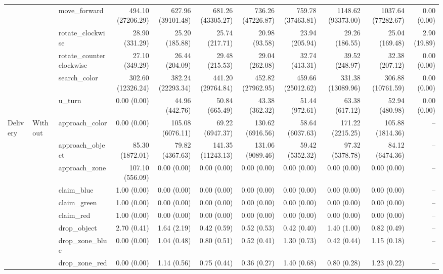 \begin{table}[t]
{\begin{tabular}{lllrrrrrrrr}
 &  & move\_forward & 494.10 (27206.29) & 627.96 (39101.48) & 681.26 (43305.27) & 736.26 (47226.87) & 759.78 (37463.81) & 1148.62 (93373.00) & 1037.64 (77282.67) & 0.00 (0.00) \\
 &  & rotate\_clockwise & 28.90 (331.29) & 25.20 (185.88) & 25.74 (217.71) & 20.98 (93.58) & 23.94 (205.94) & 29.26 (186.55) & 25.04 (169.48) & 2.90 (19.89) \\
 &  & rotate\_counterclockwise & 27.10 (349.29) & 26.44 (204.09) & 29.48 (215.53) & 29.04 (262.08) & 32.74 (413.31) & 39.52 (248.97) & 32.38 (207.12) & 0.00 (0.00) \\
 &  & search\_color & 302.60 (12326.24) & 382.24 (22293.34) & 441.20 (29764.84) & 452.82 (27962.95) & 459.66 (25012.62) & 331.38 (13089.96) & 306.88 (10761.59) & 0.00 (0.00) \\
 &  & u\_turn & 0.00 (0.00) & 44.96 (442.76) & 50.84 (665.49) & 43.38 (362.32) & 51.44 (972.61) & 63.38 (617.12) & 52.94 (480.98) & 0.00 (0.00) \\
\hline
Delivery & Without & approach\_color & 0.00 (0.00) & 105.08 (6076.11) & 69.22 (6947.37) & 130.62 (6916.56) & 58.64 (6037.63) & 171.22 (2215.25) & 105.88 (1814.36) & -- \\
 &  & approach\_object & 85.30 (1872.01) & 79.82 (4367.63) & 141.35 (11243.13) & 131.06 (9089.46) & 59.42 (5352.32) & 97.32 (5378.78) & 84.12 (6474.36) & -- \\
 &  & approach\_zone & 107.10 (556.09) & 0.00 (0.00) & 0.00 (0.00) & 0.00 (0.00) & 0.00 (0.00) & 0.00 (0.00) & 0.00 (0.00) & -- \\
 &  & claim\_blue & 1.00 (0.00) & 0.00 (0.00) & 0.00 (0.00) & 0.00 (0.00) & 0.00 (0.00) & 0.00 (0.00) & 0.00 (0.00) & -- \\
 &  & claim\_green & 1.00 (0.00) & 0.00 (0.00) & 0.00 (0.00) & 0.00 (0.00) & 0.00 (0.00) & 0.00 (0.00) & 0.00 (0.00) & -- \\
 &  & claim\_red & 1.00 (0.00) & 0.00 (0.00) & 0.00 (0.00) & 0.00 (0.00) & 0.00 (0.00) & 0.00 (0.00) & 0.00 (0.00) & -- \\
 &  & drop\_object & 2.70 (0.41) & 1.64 (2.19) & 0.42 (0.59) & 0.52 (0.53) & 0.42 (0.40) & 1.40 (1.00) & 0.82 (0.49) & -- \\
 &  & drop\_zone\_blue & 0.00 (0.00) & 1.04 (0.48) & 0.80 (0.51) & 0.52 (0.41) & 1.30 (0.73) & 0.42 (0.44) & 1.15 (0.18) & -- \\
 &  & drop\_zone\_red & 0.00 (0.00) & 1.14 (0.56) & 0.75 (0.44) & 0.36 (0.27) & 1.40 (0.68) & 0.80 (0.28) & 1.23 (0.22) & -- \\

\end{tabular}}
\end{table}
